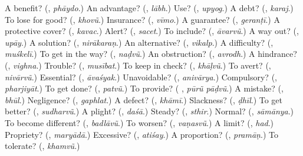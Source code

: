 \begin{tcolorbox}[breakable,colback=teal!4,colframe=teal!35!black,title={Before you move on}]
A benefit? (\textbf{}, \emph{phāydo}.) An advantage? (\textbf{}, \emph{lābh}.) Use? (\textbf{}, \emph{upyog}.) A debt? (\textbf{}, \emph{karaj}.) To lose for good? (\textbf{}, \emph{khovũ}.) Insurance? (\textbf{}, \emph{vīmo}.) A guarantee? (\textbf{}, \emph{geranṭī}.) A protective cover? (\textbf{}, \emph{kavac}.) Alert? (\textbf{}, \emph{sacet}.) To include? (\textbf{}, \emph{āvarvũ}.) A way out? (\textbf{}, \emph{upāy}.) A solution? (\textbf{}, \emph{nirākaraṇ}.) An alternative? (\textbf{}, \emph{vikalp}.) A difficulty? (\textbf{}, \emph{muśkelī}.) To get in the way? (\textbf{}, \emph{naḍvũ}.) An obstruction? (\textbf{}, \emph{avrodh}.) A hindrance? (\textbf{}, \emph{vighna}.) Trouble? (\textbf{}, \emph{musībat}.) To keep in check? (\textbf{}, \emph{khāḷvũ}.) To avert? (\textbf{}, \emph{nivārvũ}.) Essential? (\textbf{}, \emph{āvaśyak}.) Unavoidable? (\textbf{}, \emph{anivārya}.) Compulsory? (\textbf{}, \emph{pharjiyāt}.) To get done? (\textbf{}, \emph{patvũ}.) To provide? (\textbf{ }, \emph{pūrũ pāḍvũ}.) A mistake? (\textbf{}, \emph{bhūl}.) Negligence? (\textbf{}, \emph{gaphlat}.) A defect? (\textbf{}, \emph{khāmī}.) Slackness? (\textbf{}, \emph{ḍhīl}.) To get better? (\textbf{}, \emph{sudharvũ}.) A plight? (\textbf{}, \emph{daśā}.) Steady? (\textbf{}, \emph{sthir}.) Normal? (\textbf{}, \emph{sāmānya}.) To become different? (\textbf{}, \emph{badlāvũ}.) To worsen? (\textbf{}, \emph{vaṇasvũ}.) A limit? (\textbf{}, \emph{had}.) Propriety? (\textbf{}, \emph{maryādā}.) Excessive? (\textbf{}, \emph{atiśay}.) A proportion? (\textbf{}, \emph{pramāṇ}.) To tolerate? (\textbf{}, \emph{khamvũ}.)
\end{tcolorbox}
